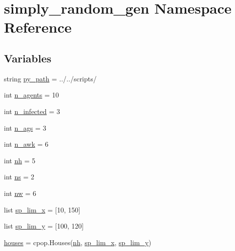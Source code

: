 \hypertarget{namespacesimply__random__gen}{}\section{simply\+\_\+random\+\_\+gen Namespace Reference}
\label{namespacesimply__random__gen}
\subsection*{Variables}
\begin{DoxyCompactItemize}
\item 
string \hyperlink{namespacesimply__random__gen_ac68261be5248e2a62c2affb52abc84f9}{py\+\_\+path} = \textquotesingle{}../../scripts/\textquotesingle{}
\item 
int \hyperlink{namespacesimply__random__gen_ade2e4043b0d8e4226396fb5e9ce0ba52}{n\+\_\+agents} = 10
\item 
int \hyperlink{namespacesimply__random__gen_af3390662c6fd8da61ea1caee49236115}{n\+\_\+infected} = 3
\item 
int \hyperlink{namespacesimply__random__gen_af01c9c6a78cec4cc8e9ff2c2aad3193a}{n\+\_\+ags} = 3
\item 
int \hyperlink{namespacesimply__random__gen_a646fa4f0c8916280e34b24c932648a86}{n\+\_\+awk} = 6
\item 
int \hyperlink{namespacesimply__random__gen_a24ebe262faded948e24bd761f4ad30bd}{nh} = 5
\item 
int \hyperlink{namespacesimply__random__gen_a721e7874c49707de4c808d3ab54df4b7}{ns} = 2
\item 
int \hyperlink{namespacesimply__random__gen_ad8ddbf1221f0677a8da924e9dd0672d8}{nw} = 6
\item 
list \hyperlink{namespacesimply__random__gen_a55170e2a04f67ec4f79d82c14941cf12}{sp\+\_\+lim\+\_\+x} = \mbox{[}10, 150\mbox{]}
\item 
list \hyperlink{namespacesimply__random__gen_a2685d02e22bbd9a87d4bcfd842a2fa10}{sp\+\_\+lim\+\_\+y} = \mbox{[}100, 120\mbox{]}
\item 
\hyperlink{namespacesimply__random__gen_a5a6f5e6423993d89dcd5b4dc7adf9b45}{houses} = cpop.\+Houses(\hyperlink{namespacesimply__random__gen_a24ebe262faded948e24bd761f4ad30bd}{nh}, \hyperlink{namespacesimply__random__gen_a55170e2a04f67ec4f79d82c14941cf12}{sp\+\_\+lim\+\_\+x}, \hyperlink{namespacesimply__random__gen_a2685d02e22bbd9a87d4bcfd842a2fa10}{sp\+\_\+lim\+\_\+y})
\item 

\end{DoxyCompactItemize}
